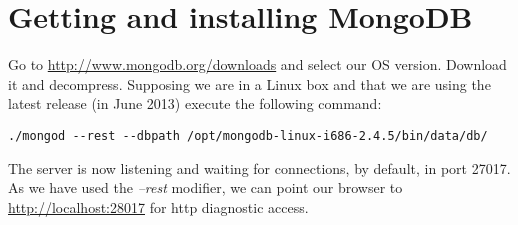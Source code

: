 \chapter{Getting and installing MongoDB}


Go to \url{http://www.mongodb.org/downloads} and select our OS version. Download it and decompress. Supposing we are in a Linux box and that we are using the latest release (in June 2013) execute the following command: \begin{verbatim}./mongod --rest --dbpath /opt/mongodb-linux-i686-2.4.5/bin/data/db/ \end{verbatim} The server is now listening and waiting for connections, by default, in port 27017. As we have used the \textit{--rest} modifier, we can point our browser to \url{http://localhost:28017} for http diagnostic access.

